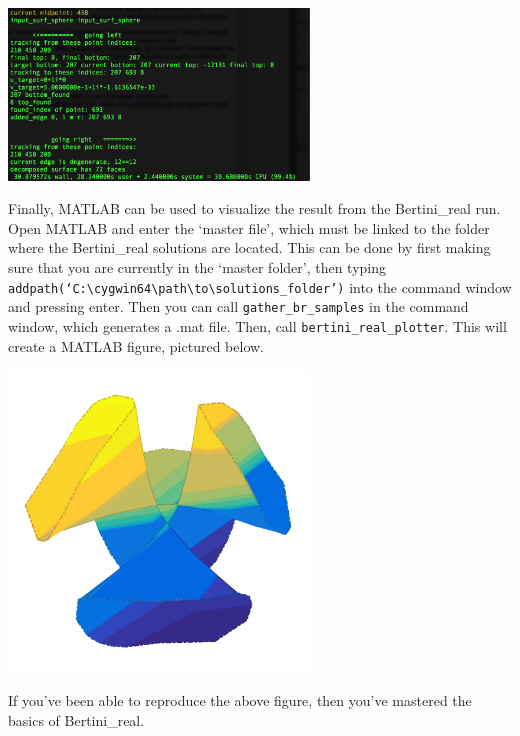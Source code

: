 \begin{center}\begin{minipage}{0.9\linewidth}
\centering
\includegraphics[width=0.6\textwidth]{CayleyCubicBertiniRealRun}
\end{minipage}\end{center}

Finally, MATLAB can be used to visualize the result from the Bertini\_real run. Open MATLAB and enter the `master file', which must be linked to the folder where the Bertini\_real solutions are located. This can be done by first making sure that you are currently in the `master folder', then typing \texttt{addpath(`C:\textbackslash{cygwin64}\textbackslash{path}\textbackslash{to}\textbackslash{solutions\_folder}')} into the command window and pressing enter. Then you can call \texttt{gather\_br\_samples} in the command window, which generates a .mat file. Then, call \texttt{bertini\_real\_plotter\-}. This will create a MATLAB figure, pictured below.

\begin{center}\begin{minipage}{0.9\linewidth}
\centering
\includegraphics[width=0.6\textwidth]{CayleyCubic}
\end{minipage}\end{center}


If you've been able to reproduce the above figure, then you've mastered the basics of Bertini\_real. 





